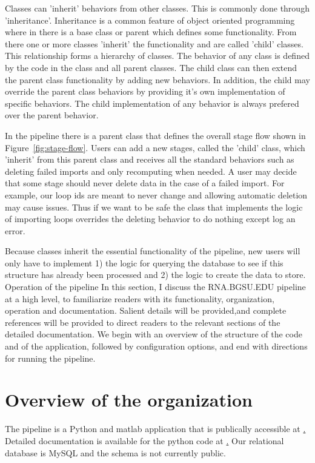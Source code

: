 Classes can 'inherit' behaviors from other classes. This is commonly done
through 'inheritance'. Inheritance is a common feature of object oriented
programming where in there is a base class or parent which defines some
functionality. From there one or more classes 'inherit' the functionality and
are called 'child' classes. This relationship forms a hierarchy of classes. The
behavior of any class is defined by the code in the class and all parent
classes. The child class can then extend the parent class functionality by
adding new behaviors. In addition, the child may override the parent class
behaviors by providing it's own implementation of specific behaviors. The child
implementation of any behavior is always prefered over the parent behavior.

In the pipeline there is a parent class that defines the overall stage flow
shown in Figure~\ref{fig:stage-flow}. Users can add a  new stages, called the
'child' class, which 'inherit' from this parent class and receives all the
standard behaviors such as deleting failed imports and only recomputing when
needed. A user may decide that some stage should never delete data in the case
of a failed import. For example, our loop ids are meant to never change and
allowing automatic deletion may cause issues. Thus if we want to be safe the
class that implements the logic of importing loops overrides the deleting
behavior to do nothing except log an error.

Because classes inherit the essential functionality of the pipeline, new users will only have to
implement 1) the logic for querying the database to see if this structure has already been
processed and 2) the logic to create the data to store.
Operation of the pipeline
In this section, I discuss the RNA.BGSU.EDU pipeline at a high level, to familiarize readers with
its functionality, organization, operation and documentation. Salient details will be provided,and
complete references will be provided to direct readers to the relevant sections of the detailed
documentation. We begin with an overview of the structure of the code and of the application,
followed by configuration options, and end with directions for running the pipeline.

\section{Overview of the organization}

The pipeline is a Python and matlab application that is publically accessible at
\href{https://github.com/BGSU-RNA/RNA-3D-Hub-core}. Detailed documentation is
available for the python code at \href{http://rna-3d-hub-core.readthedocs.io/}.
Our relational database is MySQL and the schema is not currently public.

